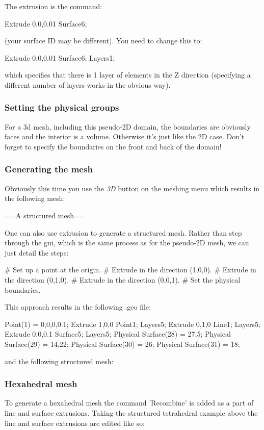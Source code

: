 The extrusion is the command:

 Extrude {0,0,0.01} {
  Surface{6};
 }

(your surface ID may be different). You need to change this to:

 Extrude {0,0,0.01} {
  Surface{6}; Layers{1};
 }

which specifies that there is 1 layer of elements in the Z direction (specifying a different number of layers works in the obvious way).

\subsubsection{Setting the physical groups}

For a 3d mesh, including this pseudo-2D domain, the boundaries are obviously faces and the interior is a volume. Otherwise it's just like the 2D case. Don't forget to specify the boundaries on the front and back of the domain!

\subsubsection{Generating the mesh}

Obviously this time you use the \textit{3D} button on the meshing menu which results in the following mesh:


==A structured mesh==

One can also use extrusion to generate a structured mesh. Rather than step through the gui, which is the same process as for the pseudo-2D mesh, we can just detail the steps:

\# Set up a point at the origin.
\# Extrude in the direction (1,0,0).
\# Extrude in the direction (0,1,0).
\# Extrude in the direction (0,0,1).
\# Set the physical boundaries.

This approach results in the following .geo file:

 Point(1) = {0,0,0,0.1};
 Extrude {1,0,0} {
   Point{1}; Layers{5};
 }
 Extrude {0,1,0} {
   Line{1}; Layers{5};
 }
 Extrude {0,0,0.1} {
   Surface{5}; Layers{5};
 }
 Physical Surface(28) = {27,5};
 Physical Surface(29) = {14,22};
 Physical Surface(30) = {26};
 Physical Surface(31) = {18};

and the following structured mesh:

\subsubsection{Hexahedral mesh}
To generate a hexahedral mesh the command 'Recombine' is added as a part of line and surface extrusions. Taking the structured tetrahedral example above the line and surface extrusions are edited like so:
 
